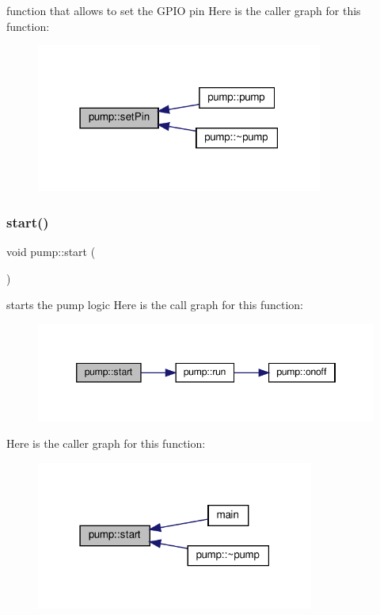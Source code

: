 function that allows to set the G\+P\+IO pin Here is the caller graph for this function\+:
\nopagebreak
\begin{figure}[H]
\begin{center}
\leavevmode
\includegraphics[width=267pt]{classpump_a3c9536b9c3d2fdb7908b6cba845990d1_icgraph}
\end{center}
\end{figure}
\mbox{\label{classpump_a324936e9353f28b7633e838a9f1fff20}} 
\subsubsection{\texorpdfstring{start()}{start()}}
{\footnotesize\ttfamily void pump\+::start (\begin{DoxyParamCaption}{ }\end{DoxyParamCaption})}

starts the pump logic Here is the call graph for this function\+:
\nopagebreak
\begin{figure}[H]
\begin{center}
\leavevmode
\includegraphics[width=346pt]{classpump_a324936e9353f28b7633e838a9f1fff20_cgraph}
\end{center}
\end{figure}
Here is the caller graph for this function\+:
\nopagebreak
\begin{figure}[H]
\begin{center}
\leavevmode
\includegraphics[width=259pt]{classpump_a324936e9353f28b7633e838a9f1fff20_icgraph}
\end{center}
\end{figure}
\mbox{\label{classpump_add87c3bee2a6faba0404e9ce115d0d17}} 
